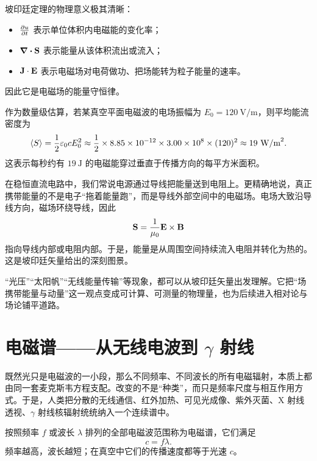 坡印廷定理的物理意义极其清晰：
\begin{itemize}
  \item $\pdv{u}{t}$ 表示单位体积内电磁能的变化率；
  \item $\div\vb{S}$ 表示能量从该体积流出或流入；
  \item $\vb{J}\cdot\vb{E}$ 表示电磁场对电荷做功、把场能转为粒子能量的速率。
\end{itemize}
因此它是电磁场的能量守恒律。

作为数量级估算，若某真空平面电磁波的电场振幅为 $E_0=120\ \text{V/m}$，则平均能流密度为
\[
\langle S \rangle=\frac{1}{2}\varepsilon_0 c E_0^2
\approx \frac{1}{2}\times 8.85\times10^{-12}\times 3.00\times10^8\times (120)^2
\approx 19\ \text{W/m}^2.
\]
这表示每秒约有 $19\ \text{J}$ 的电磁能穿过垂直于传播方向的每平方米面积。

\begin{remark}
在稳恒直流电路中，我们常说电源通过导线把能量送到电阻上。更精确地说，真正携带能量的不是电子“拖着能量跑”，而是导线外部空间中的电磁场。电场大致沿导线方向，磁场环绕导线，因此
\[
\vb{S}=\frac{1}{\mu_0}\vb{E}\times\vb{B}
\]
指向导线内部或电阻内部。于是，能量是从周围空间持续流入电阻并转化为热的。这是坡印廷矢量给出的深刻图景。
\end{remark}

\begin{remark}
“光压”“太阳帆”“无线能量传输”等现象，都可以从坡印廷矢量出发理解。它把“场携带能量与动量”这一观点变成可计算、可测量的物理量，也为后续进入相对论与场论铺平道路。
\end{remark}

\section{电磁谱——从无线电波到 $\gamma$ 射线}

既然光只是电磁波的一小段，那么不同频率、不同波长的所有电磁辐射，本质上都由同一套麦克斯韦方程支配。改变的不是“种类”，而只是频率尺度与相互作用方式。于是，人类把分散的无线通信、红外加热、可见光成像、紫外灭菌、X 射线透视、$\gamma$ 射线核辐射统统纳入一个连续谱中。

\begin{definition}[电磁谱]
按照频率 $f$ 或波长 $\lambda$ 排列的全部电磁波范围称为电磁谱，它们满足
\[
 c=f\lambda.
\]
频率越高，波长越短；在真空中它们的传播速度都等于光速 $c$。
\end{definition}

